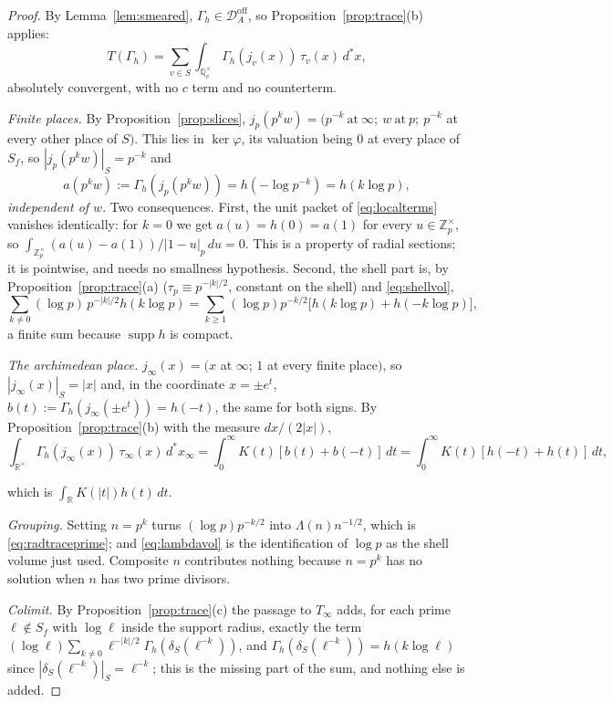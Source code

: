 \documentclass[11pt]{amsart}
\theoremstyle{definition}
\theoremstyle{remark}
\newcommand{\R}{\mathbb R}
\newcommand{\Z}{\mathbb Z}
\newcommand{\Q}{\mathbb Q}
\newcommand{\supp}{\operatorname{supp}}
\newcommand{\Doff}{\mathcal D_A^{\mathrm{off}}}
\begin{document}
\begin{proof}
By Lemma~\ref{lem:smeared}, $\Gamma_h\in\Doff$, so
Proposition~\ref{prop:trace}(b) applies:
\[
  T(\Gamma_h)=\sum_{v\in S}\int_{\Q_v^\times}\Gamma_h(j_v(x))\,\tau_v(x)\,d^*x,
\]
absolutely convergent, with no $c$ term and no counterterm.

\emph{Finite places.} By Proposition~\ref{prop:slices},
$j_p(p^kw)=(p^{-k}\ \text{at}\ \infty;\ w\ \text{at}\ p;\ p^{-k}$ at every
other place of $S)$. This lies in $\ker\varphi$, its valuation being $0$ at
every place of $S_f$, so $|j_p(p^kw)|_S=p^{-k}$ and
\[
  a(p^kw):=\Gamma_h(j_p(p^kw))=h(-\log p^{-k})=h(k\log p),
\]
\emph{independent of $w$}. Two consequences. First, the unit packet of
\eqref{eq:localterms} vanishes identically: for $k=0$ we get $a(u)=h(0)=a(1)$
for every $u\in\Z_p^\times$, so $\int_{\Z_p^\times}(a(u)-a(1))/|1-u|_p\,du=0$.
This is a property of radial sections; it is pointwise, and needs no smallness
hypothesis. Second, the shell part is, by
Proposition~\ref{prop:trace}(a) ($\tau_p\equiv p^{-|k|/2}$, constant on the
shell) and \eqref{eq:shellvol},
\[
  \sum_{k\ne0}(\log p)\,p^{-|k|/2}h(k\log p)
   =\sum_{k\ge1}(\log p)p^{-k/2}\bigl[h(k\log p)+h(-k\log p)\bigr],
\]
a finite sum because $\supp h$ is compact.

\emph{The archimedean place.} $j_\infty(x)=(x$ at $\infty$; $1$ at every finite
place$)$, so $|j_\infty(x)|_S=|x|$ and, in the coordinate $x=\pm e^t$,
$b(t):=\Gamma_h(j_\infty(\pm e^t))=h(-t)$, the same for both signs. By
Proposition~\ref{prop:trace}(b) with the measure $dx/(2|x|)$,
\[
  \int_{\R^\times}\Gamma_h(j_\infty(x))\,\tau_\infty(x)\,d^*x_\infty
   =\int_0^\infty K(t)[b(t)+b(-t)]\,dt
   =\int_0^\infty K(t)[h(-t)+h(t)]\,dt,
\]

which is $\int_\R K(|t|)h(t)\,dt$.

\emph{Grouping.} Setting $n=p^k$ turns $(\log p)p^{-k/2}$ into
$\Lambda(n)n^{-1/2}$, which is \eqref{eq:radtraceprime}; and
\eqref{eq:lambdavol} is the identification of $\log p$ as the shell volume just
used. Composite $n$ contributes nothing because $n=p^k$ has no solution when
$n$ has two prime divisors.

\emph{Colimit.} By Proposition~\ref{prop:trace}(c) the passage to $T_\infty$
adds, for each prime $\ell\notin S_f$ with $\log\ell$ inside the support
radius, exactly the term $(\log\ell)\sum_{k\ne0}\ell^{-|k|/2}
\Gamma_h(\delta_S(\ell^{-k}))$, and $\Gamma_h(\delta_S(\ell^{-k}))=h(k\log\ell)$
since $|\delta_S(\ell^{-k})|_S=\ell^{-k}$; this is the missing part of the
sum, and nothing else is added.
\end{proof}
\end{document}
